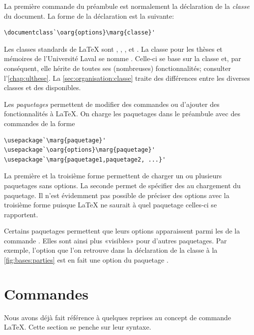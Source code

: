 La première commande du préambule est normalement la déclaration de la
\emph{classe} du document. La forme de la déclaration est la suivante:
\begin{lstlisting}
\documentclass`\oarg{options}\marg{classe}'
\end{lstlisting}
Les classes standards de {\LaTeX} sont ,
, ,  et . La
classe pour les thèses et mémoires de l'Université Laval se nomme
 \citep{ulthese}. Celle-ci se base sur la classe
 et, par conséquent, elle hérite de toutes ses (nombreuses)
fonctionnalités; consulter l'\autoref{chap:ulthese}. La
\autoref{sec:organisation:classe} traite des différences entre les
diverses classes et des  disponibles.

Les \emph{paquetages} permettent de modifier des commandes ou
d'ajouter des fonctionnalités à {\LaTeX}. On charge les paquetages
dans le préambule avec des commandes de la forme
\begin{lstlisting}
\usepackage`\marg{paquetage}'
\usepackage`\oarg{options}\marg{paquetage}'
\usepackage`\marg{paquetage1,paquetage2, ...}'
\end{lstlisting}
La première et la troisième forme permettent de charger un ou
plusieurs paquetages sans options. La seconde permet de spécifier des
 au chargement du paquetage. Il n'est évidemment pas
possible de préciser des options avec la troisième forme puisque
{\LaTeX} ne saurait à quel paquetage celles-ci se rapportent.

Certains paquetages permettent que leurs options apparaissent parmi
les  de la commande \cmdprint{\documentclass}. Elles
sont ainsi plus «visibles» pour d'autres paquetages. Par exemple,
l'option  que l'on retrouve dans la déclaration de la
classe à la \autoref{fig:bases:parties} est en fait une option du
paquetage .


\section{Commandes}
\label{sec:bases:commandes}

Nous avons déjà fait référence à quelques reprises au concept de
commande {\LaTeX}. Cette section se penche sur leur syntaxe.

